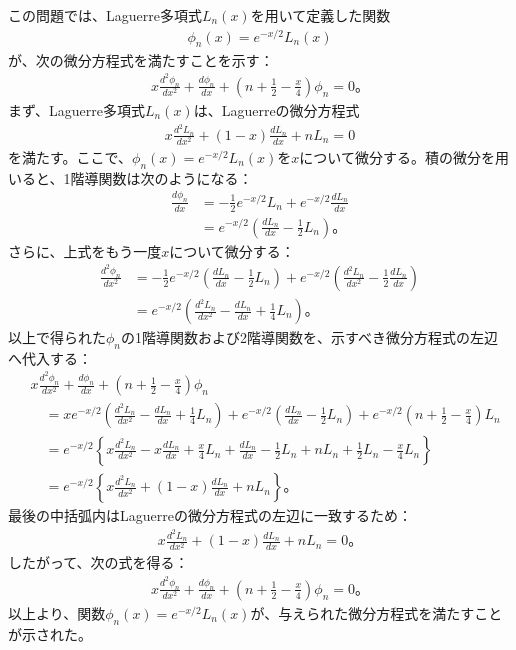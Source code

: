 \documentclass[platex,dvipdfmx,a4paper]{jsarticle}
\newcommand{\bbn}[2]{\frac{d #1}{d #2}}
\newcommand{\nbbn}[3]{\frac{d^{#1} #2}{d #3^{#1}}}
\begin{document}
  この問題では、Laguerre多項式$L_n(x)$を用いて定義した関数
  \begin{align*}
    \phi_n(x)=e^{-x/2}L_n(x)
  \end{align*}
  が、次の微分方程式を満たすことを示す：
  \begin{align*}
    x\nbbn{2}{\phi_n}{x}
    +\bbn{\phi_n}{x}
    +\left(n+\frac{1}{2}-\frac{x}{4}\right)\phi_n
    =0。
  \end{align*}
  まず、Laguerre多項式$L_n(x)$は、Laguerreの微分方程式
  \begin{align*}
    x\nbbn{2}{L_n}{x}
    +(1-x)\bbn{L_n}{x}
    +nL_n
    =0
  \end{align*}
  を満たす。ここで、$\phi_n(x)=e^{-x/2}L_n(x)$を$x$について微分する。積の微分を用いると、1階導関数は次のようになる：
  \begin{align*}
    \bbn{\phi_n}{x}
    &=-\frac{1}{2}e^{-x/2}L_n+e^{-x/2}\bbn{L_n}{x}\\
    &=e^{-x/2}\left(\bbn{L_n}{x}-\frac{1}{2}L_n\right)。
  \end{align*}
  さらに、上式をもう一度$x$について微分する：
  \begin{align*}
    \nbbn{2}{\phi_n}{x}
    &=-\frac{1}{2}e^{-x/2}\left(\bbn{L_n}{x}-\frac{1}{2}L_n\right)
    +e^{-x/2}\left(\nbbn{2}{L_n}{x}-\frac{1}{2}\bbn{L_n}{x}\right)\\
    &=e^{-x/2}\left(\nbbn{2}{L_n}{x}-\bbn{L_n}{x}+\frac{1}{4}L_n\right)。
  \end{align*}
  以上で得られた$\phi_n$の1階導関数および2階導関数を、示すべき微分方程式の左辺へ代入する：
  \begin{align*}
    &x\nbbn{2}{\phi_n}{x}
    +\bbn{\phi_n}{x}
    +\left(n+\frac{1}{2}-\frac{x}{4}\right)\phi_n\\
    &\quad
    =xe^{-x/2}\left(\nbbn{2}{L_n}{x}-\bbn{L_n}{x}+\frac{1}{4}L_n\right)
    +e^{-x/2}\left(\bbn{L_n}{x}-\frac{1}{2}L_n\right)
    +e^{-x/2}\left(n+\frac{1}{2}-\frac{x}{4}\right)L_n\\
    &\quad
    =e^{-x/2}\left\{
      x\nbbn{2}{L_n}{x}
      -x\bbn{L_n}{x}
      +\frac{x}{4}L_n
      +\bbn{L_n}{x}
      -\frac{1}{2}L_n
      +nL_n
      +\frac{1}{2}L_n
      -\frac{x}{4}L_n
    \right\}\\
    &\quad
    =e^{-x/2}\left\{
      x\nbbn{2}{L_n}{x}
      +(1-x)\bbn{L_n}{x}
      +nL_n
    \right\}。
  \end{align*}
  最後の中括弧内はLaguerreの微分方程式の左辺に一致するため：
  \begin{align*}
    x\nbbn{2}{L_n}{x}
    +(1-x)\bbn{L_n}{x}
    +nL_n
    =0。
  \end{align*}
  したがって、次の式を得る：
  \begin{align*}
    x\nbbn{2}{\phi_n}{x}
    +\bbn{\phi_n}{x}
    +\left(n+\frac{1}{2}-\frac{x}{4}\right)\phi_n
    =0。
  \end{align*}
  以上より、関数$\phi_n(x)=e^{-x/2}L_n(x)$が、与えられた微分方程式を満たすことが示された。
\end{document}

